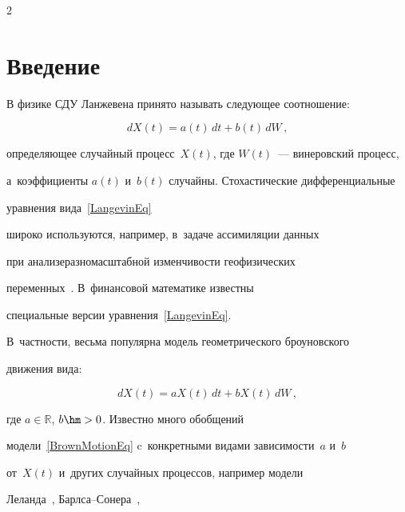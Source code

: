 \begin{multicols}{2}



\label{st\stat}



\section{Введение}



В физике СДУ Ланжевена принято называть сле\-ду\-ющее соотношение:

\begin{equation}

\label{LangevinEq}

dX(t)=a(t)\,dt+b(t)\,dW\,,

\end{equation}

определяющее случайный процесс~$X(t)$, где $W(t)$~--- винеровский процесс, 

а~коэффициенты $a(t)$ и~$b(t)$ случайны. Стохастические дифференциальные 

уравнения вида~\eqref{LangevinEq} 

широко используются, например, в~задаче ассимиляции данных 

при анализе\linebreak раз\-но\-мас\-штаб\-ной из\-мен\-чи\-вости геофизических 

пе\-ре\-менных~\cite{Belyaev2018}. В~финансовой математике из\-вест\-ны 

специальные вер\-сии урав\-не\-ния~\eqref{LangevinEq}. 

В~частности, весьма популярна модель геометрического броуновского 

движения вида:

\begin{equation}

\label{BrownMotionEq}

dX(t)=aX(t)\,dt+b X(t)\,dW\,,

\end{equation}

где $a\in\mathbb{R}$, $b\hm>0$. Известно много обобщений 

модели~\eqref{BrownMotionEq} c~конкретными видами за\-ви\-си\-мости~$a$ и~$b$ 

от~$X(t)$ и~других случайных процессов, например модели 

Леланда~\cite{Leland1985}, Барл\-са--Со\-не\-ра~\cite{BarlesSoner1998}, 


\end{multicols}
